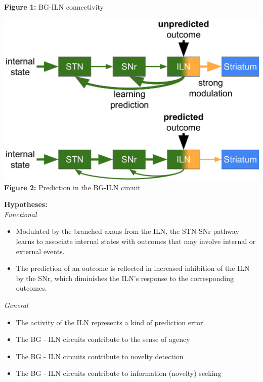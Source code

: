 \documentclass[portrait,final,a0paper,fontscale=0.30]{baposter}
\begin{document}
\begin{poster}
{\begin{adjustbox}{minipage=\textwidth, margin=2pt, center}
\begin{minipage}{0.25\textwidth}
        \textbf{Figure 1:} BG-ILN connectivity
    \end{minipage}
    \hspace{0.01\textwidth}
    \begin{minipage}{0.25\textwidth}
        \centering
        \includegraphics[width=\textwidth]{figures/circuit_idea_2.pdf}
        \textbf{Figure 2:} Prediction in the BG-ILN circuit
    \end{minipage}
    \hspace{0.01\textwidth}
    \begin{minipage}{0.18\textwidth}
        \textbf{Hypotheses:}\\
        \vfill
        \textit{Functional}
        \begin{itemize}
            \item Modulated by the branched axons from the ILN, the STN-SNr pathway learns to associate internal states with outcomes that may involve internal or external events.
            \item The prediction of an outcome is reflected in increased inhibition of the ILN by the SNr, which diminishes the ILN's response to the corresponding outcomes.
        \end{itemize}
        \vspace{5pt}
        
        \textit{General}
        \begin{itemize}
            \item The activity of the ILN represents a kind of prediction error.
            \item The BG - ILN circuits contribute to the sense of agency
            \item The BG - ILN circuits contribute to novelty detection
            \item The BG - ILN circuits contribute to information (novelty) seeking
        \end{itemize}        
    \end{minipage}
    \hfill


\end{adjustbox}}
\end{poster}
\end{document}
